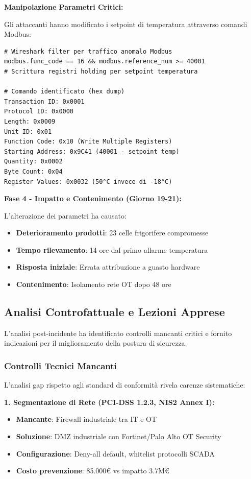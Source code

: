 \textbf{Manipolazione Parametri Critici:}

Gli attaccanti hanno modificato i setpoint di temperatura attraverso comandi Modbus:
\begin{lstlisting}[caption={Ricostruzione Comandi Modbus Malevoli},label={lst:modbus_attack}]
# Wireshark filter per traffico anomalo Modbus
modbus.func_code == 16 && modbus.reference_num >= 40001
# Scrittura registri holding per setpoint temperatura

# Comando identificato (hex dump)
Transaction ID: 0x0001
Protocol ID: 0x0000
Length: 0x0009
Unit ID: 0x01
Function Code: 0x10 (Write Multiple Registers)
Starting Address: 0x9C41 (40001 - setpoint temp)
Quantity: 0x0002
Byte Count: 0x04
Register Values: 0x0032 (50°C invece di -18°C)
\end{lstlisting}

\textbf{Fase 4 - Impatto e Contenimento (Giorno 19-21):}

L'alterazione dei parametri ha causato:
\begin{itemize}
    \item \textbf{Deterioramento prodotti}: 23 celle frigorifere compromesse
    \item \textbf{Tempo rilevamento}: 14 ore dal primo allarme temperatura
    \item \textbf{Risposta iniziale}: Errata attribuzione a guasto hardware
    \item \textbf{Contenimento}: Isolamento rete OT dopo 48 ore
\end{itemize}

\subsection{\texorpdfstring{Analisi Controfattuale e Lezioni Apprese}{4.5.2 - Analisi Controfattuale e Lezioni Apprese}}

L'analisi post-incidente ha identificato controlli mancanti critici e fornito indicazioni per il miglioramento della postura di sicurezza\autocite{Pearl2018}.

\subsubsection{\texorpdfstring{Controlli Tecnici Mancanti}{4.5.2.1 - Controlli Tecnici Mancanti}}

L'analisi gap rispetto agli standard di conformità rivela carenze sistematiche:

\textbf{1. Segmentazione di Rete (PCI-DSS 1.2.3, NIS2 Annex I):}
\begin{itemize}
    \item \textbf{Mancante}: Firewall industriale tra IT e OT
    \item \textbf{Soluzione}: DMZ industriale con Fortinet/Palo Alto OT Security
    \item \textbf{Configurazione}: Deny-all default, whitelist protocolli SCADA
    \item \textbf{Costo prevenzione}: 85.000€ vs impatto 3.7M€
\end{itemize}

